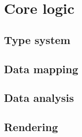 \chapter{Core logic}
\label{chap:core-logic}


\section{Type system}

\section{Data mapping}
\section{Data analysis}
\section{Rendering}
